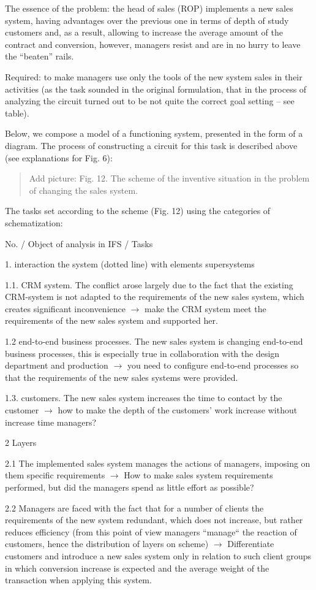 \documentclass[11pt,a4paper]{book}
\newcommand{\addpicture}[1]{
  \begin{quote} Add picture: #1\end{quote}
}
\begin{document}
The essence of the problem: the head of sales (ROP) implements a new sales
system, having advantages over the previous one in terms of depth of study
customers and, as a result, allowing to increase the average amount of the
contract and conversion, however, managers resist and are in no hurry to leave
the “beaten” rails.

Required: to make managers use only the tools of the new system sales in their
activities (as the task sounded in the original formulation, that in the
process of analyzing the circuit turned out to be not quite the correct goal
setting -- see table).

Below, we compose a model of a functioning system, presented in the form of a
diagram.  The process of constructing a circuit for this task is described
above (see explanations for Fig. 6):

\addpicture{Fig. 12. The scheme of the inventive situation in the problem of
  changing the sales system.}

The tasks set according to the scheme (Fig. 12) using the categories of
schematization:


No. / Object of analysis in IFS / Tasks

1. interaction the system (dotted line) with elements supersystems

1.1.  CRM system. The conflict arose largely due to the fact that the existing
CRM-system is not adapted to the requirements of the new sales system, which
creates significant inconvenience $\to$ make the CRM system meet the
requirements of the new sales system and supported her.

1.2 end-to-end business processes. The new sales system is changing end-to-end
business processes, this is especially true in collaboration with the design
department and production $\to$ you need to configure end-to-end processes so
that the requirements of the new sales systems were provided.

1.3.  customers. The new sales system increases the time to contact by the
customer $\to$ how to make the depth of the customers' work increase without
increase time managers?

2 Layers

2.1 The implemented sales system manages the actions of managers, imposing on
them specific requirements $\to$ How to make sales system requirements
performed, but did the managers spend as little effort as possible?

2.2 Managers are faced with the fact that for a number of clients the
requirements of the new system redundant, which does not increase, but rather
reduces efficiency (from this point of view managers “manage“ the reaction of
customers, hence the distribution of layers on scheme) $\to$ Differentiate
customers and introduce a new sales system only in relation to such client
groups in which conversion increase is expected and the average weight of the
transaction when applying this system.
\end{document}
